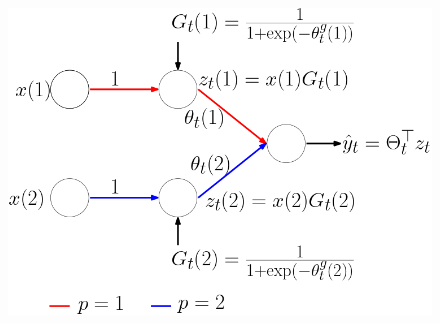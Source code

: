 \begin{figure}[!b]
\begin{minipage}{0.15\columnwidth}
\includegraphics[scale=0.15]{figs/featlearn.png}
\end{minipage}
\hspace{50pt}
\begin{minipage}{0.8\columnwidth}
\end{minipage}
\end{figure}

